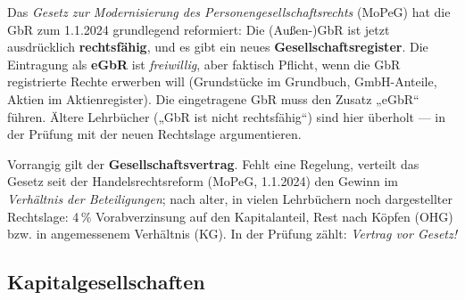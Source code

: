 \documentclass[11pt, a4paper]{article}
\begin{document}
\begin{achtung}[title={\bfseries Aktuelle Rechtslage: MoPeG und eGbR (seit 1.1.2024)}]
Das \emph{Gesetz zur Modernisierung des Personengesellschaftsrechts} (MoPeG) hat die GbR
zum 1.1.2024 grundlegend reformiert: Die (Außen-)GbR ist jetzt ausdrücklich
\textbf{rechtsfähig}, und es gibt ein neues \textbf{Gesellschaftsregister}. Die
Eintragung als \textbf{eGbR} ist \emph{freiwillig}, aber faktisch Pflicht, wenn die GbR
registrierte Rechte erwerben will (Grundstücke im Grundbuch, GmbH-Anteile,
Aktien im Aktienregister). Die eingetragene GbR muss den Zusatz „eGbR`` führen. Ältere Lehrbücher
(„GbR ist nicht rechtsfähig``) sind hier überholt --- in der Prüfung mit der neuen
Rechtslage argumentieren.
\end{achtung}

\begin{merksatz}[title={\bfseries Gewinnverteilung bei OHG und KG}]
Vorrangig gilt der \textbf{Gesellschaftsvertrag}. Fehlt eine Regelung, verteilt das
Gesetz seit der Handelsrechtsreform (MoPeG, 1.1.2024) den Gewinn im \emph{Verhältnis der
Beteiligungen}; nach alter, in vielen Lehrbüchern noch dargestellter Rechtslage: 4\,\%
Vorabverzinsung auf den Kapitalanteil, Rest nach Köpfen (OHG) bzw. in angemessenem
Verhältnis (KG). In der Prüfung zählt: \emph{Vertrag vor Gesetz!}
\end{merksatz}

\subsection{Kapitalgesellschaften}
\end{document}

